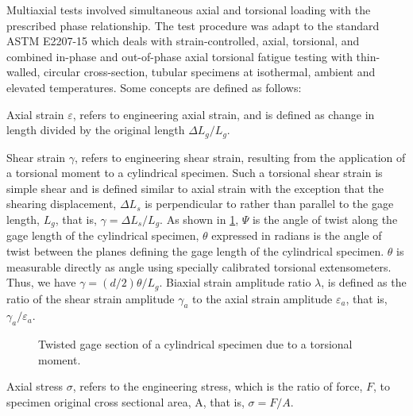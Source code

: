 Multiaxial tests involved simultaneous axial and torsional loading with the prescribed phase relationship.
The test procedure was adapt to the standard ASTM E2207-15 which deals with strain-controlled, axial, torsional, and combined in-phase and out-of-phase axial torsional fatigue testing with thin-walled, circular cross-section, tubular specimens at isothermal, ambient and elevated temperatures.
Some concepts are defined as follows:

Axial strain $\varepsilon$, refers to engineering axial strain, and is defined as change in length divided by the original length $\Delta L_g/L_g$.

Shear strain $\gamma$, refers to engineering shear strain, resulting from the application of a torsional moment to a cylindrical specimen.
Such a torsional shear strain is simple shear and is defined similar to axial strain with the exception that the shearing displacement, $\Delta L_s$ is perpendicular to rather than parallel to the gage length, $L_g$, that is, $\gamma=\Delta L_s/L_g$.
As shown in \ref{Fig:Shear_Strain}, $\Psi$ is the angle of twist along the gage length of the cylindrical specimen, $\theta$ expressed in radians is the angle of twist between the planes defining the gage length of the cylindrical specimen.
$\theta$ is measurable directly as angle using specially calibrated torsional extensometers.
Thus, we have $\gamma = (d/2)\theta/ L_g$.
Biaxial strain amplitude ratio $\lambda$, is defined as the ratio of the shear strain amplitude $\gamma_a$ to the axial strain amplitude $\varepsilon_a$, that is, $\gamma_a/\varepsilon_a$.
\begin{figure}[!htp]
\centering{}
\caption{Twisted gage section of a cylindrical specimen due to a torsional moment.}
\label{Fig:Shear_Strain}
\end{figure}

Axial stress $\sigma$, refers to the engineering stress, which is the ratio of force, $F$, to specimen original cross sectional area, A, that is, $\sigma=F/A$.

